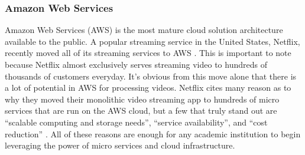 \subsubsection{\label{subsubsection:aws}Amazon Web Services}
Amazon Web Services (AWS) is the most mature cloud solution architecture
available to the public. A popular streaming service in the United States,
Netflix, recently moved all of its streaming services to AWS
\cite{netflixawsmove}. This is important to note because Netflix almost
exclusively serves streaming video to hundreds of thousands of customers
everyday. It's obvious from this move alone that there is a lot of potential in
AWS for processing videos. Netflix cites many reason as to why they moved their
monolithic video streaming app to hundreds of micro services that are run on the
AWS cloud, but a few that truly stand out are \enquote{scalable computing and
storage needs}, \enquote{service availability}, and \enquote{cost reduction}
\cite{netflixawsmove}. All of these reasons are enough for any academic
institution to begin leveraging the power of micro services and cloud
infrastructure.

